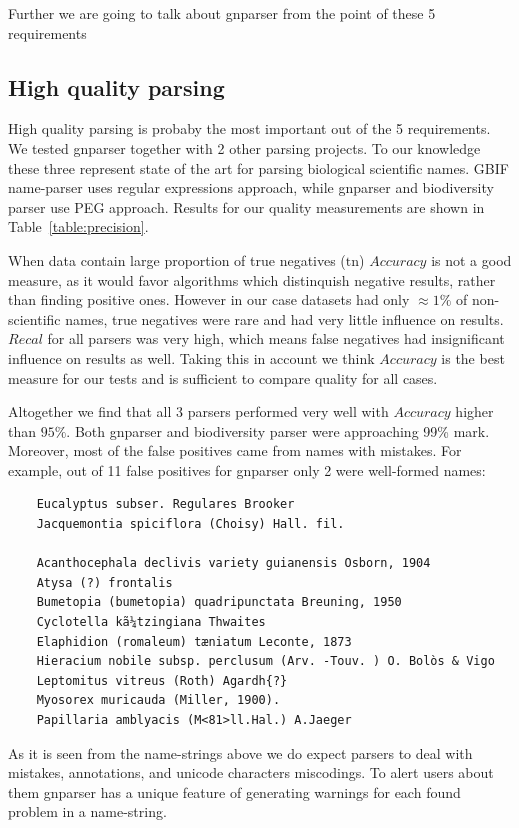 \documentclass{bmcart}
\begin{document}
Further we are going to talk about gnparser from the point of these 5
requirements

\subsection*{High quality parsing}

High quality parsing is probaby the most important out of the 5 requirements.
We tested gnparser together with 2 other parsing projects. To our knowledge
these three represent state of the art for parsing biological scientific
names. GBIF name-parser uses regular expressions approach, while gnparser and
biodiversity parser use PEG approach. Results for our quality measurements are
shown in Table~\ref{table:precision}.

When data contain large proportion of true negatives ($\text{tn}$) $Accuracy$
is not a good measure, as it would favor algorithms which distinquish negative
results, rather than finding positive ones. However in our case datasets had
only $\approx1\%$ of non-scientific names, true negatives were rare and had
very little influence on results. $Recal$ for all parsers was very high, which
means false negatives had insignificant influence on results as well. Taking
this in account we think $Accuracy$ is the best measure for our tests and
is sufficient to compare quality for all cases.

Altogether we find that all 3 parsers performed very well with $Accuracy$
higher than $95\%$. Both gnparser and biodiversity parser were approaching
99\% mark. Moreover, most of the false positives came from names with
mistakes. For example, out of 11 false positives for gnparser only 2 were
well-formed names:

\begin{verbatim}
    Eucalyptus subser. Regulares Brooker
    Jacquemontia spiciflora (Choisy) Hall. fil.

    Acanthocephala declivis variety guianensis Osborn, 1904
    Atysa (?) frontalis
    Bumetopia (bumetopia) quadripunctata Breuning, 1950
    Cyclotella kã¼tzingiana Thwaites
    Elaphidion (romaleum) tæniatum Leconte, 1873
    Hieracium nobile subsp. perclusum (Arv. -Touv. ) O. Bolòs & Vigo
    Leptomitus vitreus (Roth) Agardh{?}
    Myosorex muricauda (Miller, 1900).
    Papillaria amblyacis (M<81>ll.Hal.) A.Jaeger
\end{verbatim}

As it is seen from the name-strings above we do expect parsers to deal with
mistakes, annotations, and unicode characters miscodings. To alert users
about them gnparser has a unique feature of generating warnings for each found
problem in a name-string.
\end{document}
